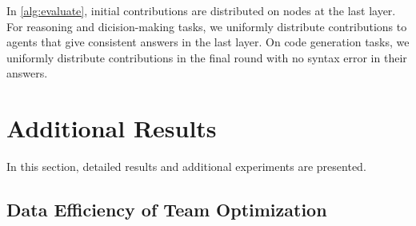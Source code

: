 \documentclass{article} %
\begin{document}
In \cref{alg:evaluate}, initial contributions are distributed on nodes at the last layer. For reasoning and dicision-making tasks, we uniformly distribute contributions to agents that give consistent answers in the last layer. On code generation tasks, we uniformly distribute contributions in the final round with no syntax error in their answers.


\section{Additional Results} \label{app:b}

In this section, detailed results and additional experiments are presented. 

\begin{table}
\vspace{-1.5em}
\begin{center}
\end{center}
\label{tab:general}
\end{table}

\subsection{Data Efficiency of Team Optimization}\label{app:data-efficiency}
\end{document}

